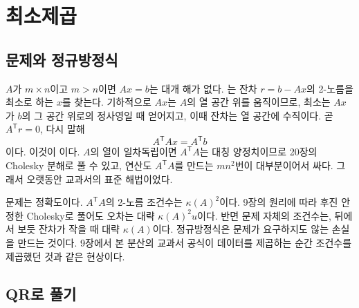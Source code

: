 \chapter{최소제곱}
\label{ch:least-squares}


\section{문제와 정규방정식}
\label{sec:normal-equations}

$A$가 $m\times n$이고 $m>n$이면 $Ax=b$는 대개 해가 없다. 는 잔차 $r=b-Ax$의 2-노름을 최소로 하는 $x$를 찾는다. 기하적으로 $Ax$는 $A$의 열 공간 위를 움직이므로, 최소는 $Ax$가 $b$의 그 공간 위로의 정사영일 때 얻어지고, 이때 잔차는 열 공간에 수직이다. 곧 $A^{\mathsf T}r=0$, 다시 말해
\begin{equation}
\label{eq:normal}
A^{\mathsf T}Ax=A^{\mathsf T}b
\end{equation}
이다. 이것이 이다. $A$의 열이 일차독립이면 $A^{\mathsf T}A$는 대칭 양정치이므로 20장의 Cholesky 분해로 풀 수 있고, 연산도 $A^{\mathsf T}A$를 만드는 $mn^2$번이 대부분이어서 싸다. 그래서 오랫동안 교과서의 표준 해법이었다.

문제는 정확도이다. $A^{\mathsf T}A$의 2-노름 조건수는 $\kappa(A)^2$이다. 9장의 원리에 따라 후진 안정한 Cholesky로 풀어도 오차는 대략 $\kappa(A)^2u$이다. 반면 문제 자체의 조건수는, 뒤에서 보듯 잔차가 작을 때 대략 $\kappa(A)$이다. 정규방정식은 문제가 요구하지도 않는 손실을 만드는 것이다. 9장에서 본 분산의 교과서 공식이 데이터를 제곱하는 순간 조건수를 제곱했던 것과 같은 현상이다.

\section{QR로 풀기}
\label{sec:ls-qr}

